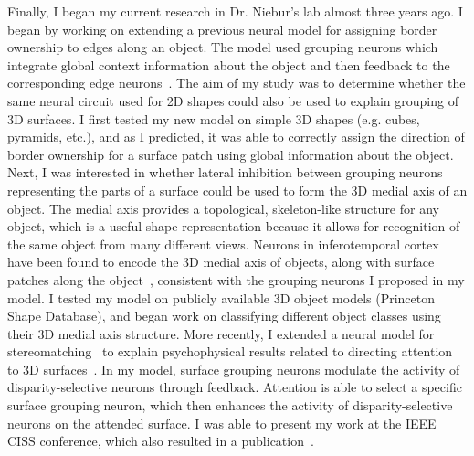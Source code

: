 \documentclass[11pt,notitlepage]{article}
\begin{document}
Finally, I began my current research in Dr. Niebur's lab almost three years ago. I began by working on extending a previous neural model for assigning border ownership to edges along an object. The model used grouping neurons which integrate global context information about the object and then feedback to the corresponding edge neurons~\citep{Craft_etal07}. The aim of my study was to determine whether the same neural circuit used for 2D shapes could also be used to explain grouping of  3D surfaces. I first tested my new model on simple 3D shapes (e.g. cubes, pyramids, etc.), and as I predicted, it was able to correctly assign the direction of border ownership for a surface patch using global information about the object. Next, I was interested in whether lateral inhibition between grouping neurons representing the parts of a surface could be used to form the 3D medial axis of an object. The medial axis provides a topological, skeleton-like structure for any object, which is a useful shape representation because it allows for recognition of the same object from many different views. Neurons in inferotemporal cortex have been found to encode the 3D medial axis of objects, along with surface patches along the object~\citep{Hung_etal12}, consistent with the grouping neurons I proposed in my model. I tested my model on publicly available 3D object models (Princeton Shape Database), and began work on classifying different object classes using their 3D medial axis structure. More recently, I extended a neural model for stereomatching~\citep{Marshall_etal96} to explain psychophysical results related to directing attention to 3D surfaces~\citep{He_Nakayama95}. In my model, surface grouping neurons modulate the activity of disparity-selective neurons through feedback. Attention is able to select a specific surface grouping neuron, which then enhances the activity of disparity-selective neurons on the attended surface. I was able to present my work at the IEEE CISS conference, which also resulted in a publication~\citep{Hu_etal15a}.

\end{document}
